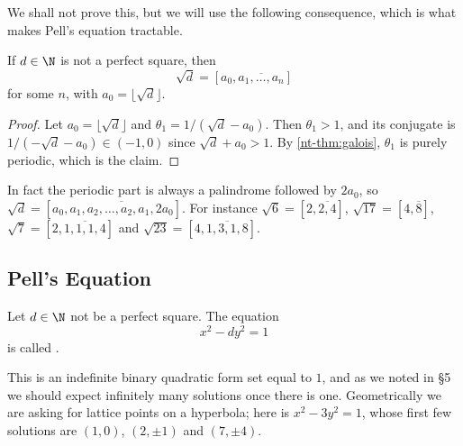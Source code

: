 We shall not prove this, but we will use the following consequence, which is what makes Pell's equation tractable.

\begin{corollary}\label{cor:sqrtd}
	If $d \in \N$ is not a perfect square, then
	$$
	\sqrt d = [a_0, \overline{a_1, \dots, a_n}]
	$$
	for some $n$, with $a_0 = \lfloor\sqrt d\rfloor$.
\end{corollary}
\begin{proof}
	Let $a_0 = \lfloor\sqrt d\rfloor$ and $\theta_1 = 1/(\sqrt d - a_0)$. Then $\theta_1 > 1$, and its conjugate is $1/(-\sqrt d - a_0) \in (-1, 0)$ since $\sqrt d + a_0 > 1$. By \autoref{nt-thm:galois}, $\theta_1$ is purely periodic, which is the claim.
\end{proof}

\begin{remark}
	In fact the periodic part is always a palindrome followed by $2a_0$, so $\sqrt d = [a_0, \overline{a_1, a_2, \dots, a_2, a_1, 2a_0}]$. For instance $\sqrt6 = [2,\overline{2,4}]$, $\sqrt{17} = [4, \overline 8]$, $\sqrt7 = [2, \overline{1,1,1,4}]$ and $\sqrt{23} = [4, \overline{1,3,1,8}]$.
\end{remark}

\subsection{Pell's Equation}

\begin{definition}
	Let $d \in \N$ not be a perfect square. The equation
	$$
	x^2 - dy^2 = 1
	$$
	is called .
\end{definition}

This is an indefinite binary quadratic form set equal to $1$, and as we noted in \S5 we should expect infinitely many solutions once there is one. Geometrically we are asking for lattice points on a hyperbola; here is $x^2 - 3y^2 = 1$, whose first few solutions are $(1,0)$, $(2, \pm1)$ and $(7, \pm4)$.

\begin{center}
\end{center}

